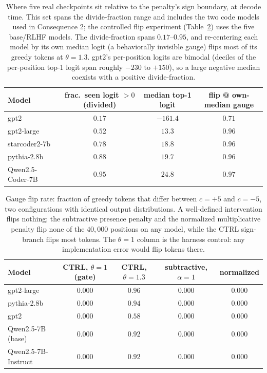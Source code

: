 \documentclass[11pt]{article}
\newcommand{\thp}{\theta}
\begin{document}
\begin{table}[t]
\centering
\caption{Where five real checkpoints sit relative to the penalty's sign boundary, at decode time.
This set spans the divide-fraction range and includes the two code models used in Consequence 2;
the controlled flip experiment (Table~\ref{tab:a1}) uses the five base/RLHF models. The
divide-fraction spans $0.17$--$0.95$, and re-centering each model by its own median logit (a
behaviorally invisible gauge) flips most of its greedy tokens at $\thp=1.3$. gpt2's per-position
logits are bimodal (deciles of the per-position top-1 logit span roughly $-230$ to $+150$), so a large negative median
coexists with a positive divide-fraction.}
\label{tab:zeropoint}
\setlength{\tabcolsep}{4pt}
\begin{tabular}{lccc}
\toprule
Model & frac.\ seen logit $>0$ (divided) & median top-1 logit & flip @ own-median gauge \\
\midrule
gpt2              & $0.17$ & $-161.4$ & $0.71$ \\
gpt2-large        & $0.52$ & $13.3$  & $0.96$ \\
starcoder2-7b     & $0.78$ & $18.8$  & $0.96$ \\
pythia-2.8b       & $0.88$ & $19.7$  & $0.96$ \\
Qwen2.5-Coder-7B  & $0.95$ & $24.8$  & $0.97$ \\
\bottomrule
\end{tabular}
\end{table}

\begin{table}[t]
\centering
\caption{Gauge flip rate: fraction of greedy tokens that differ between $c=+5$ and $c=-5$, two
configurations with identical output distributions. A well-defined intervention flips nothing;
the subtractive presence penalty and the normalized multiplicative penalty flip none of the
$40{,}000$ positions on any model, while the CTRL sign-branch flips most tokens. The
$\thp{=}1$ column is the harness control: any implementation error would flip tokens there.}
\label{tab:a1}
\begin{tabular}{lcccc}
\toprule
Model & CTRL, $\thp{=}1$ (gate) & CTRL, $\thp{=}1.3$ & subtractive, $\alpha{=}1$ & normalized \\
\midrule
gpt2-large           & $0.000$ & $0.96$ & $0.000$ & $0.000$ \\
pythia-2.8b          & $0.000$ & $0.94$ & $0.000$ & $0.000$ \\
gpt2                 & $0.000$ & $0.58$ & $0.000$ & $0.000$ \\
Qwen2.5-7B (base)    & $0.000$ & $0.92$ & $0.000$ & $0.000$ \\
Qwen2.5-7B-Instruct  & $0.000$ & $0.92$ & $0.000$ & $0.000$ \\
\bottomrule
\end{tabular}
\end{table}
\end{document}
